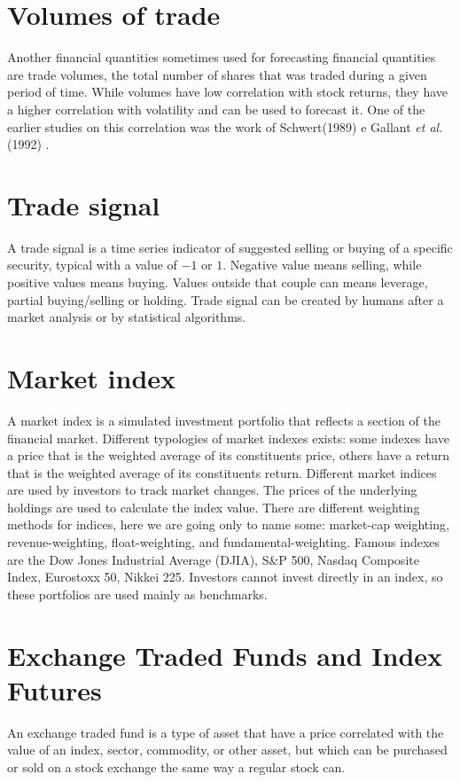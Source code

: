 \section{Volumes of trade}
\label{s:volume_of_trade}

Another financial quantities sometimes used for forecasting financial quantities are trade volumes, the total number of shares that was traded during a given period of time. While volumes have low correlation with stock returns, they have a higher correlation with volatility and can be used to forecast it. One of the earlier studies on this correlation was the work of Schwert(1989) \cite{schwert1989does} e Gallant \textit{et al.} (1992) \cite{gallant1992stock}. 

\section{Trade signal}
\label{s:trade_signal}

A trade signal is a time series indicator of suggested selling or buying of a specific security, typical with a value of $-1$ or $1$. Negative value means selling, while positive values means buying. Values outside that couple can means leverage, partial buying/selling or holding. 
Trade signal can be created by humans after a market analysis or by statistical algorithms.

\section{Market index}
\label{s:market_index}
A market index is a simulated investment portfolio that reflects a section of the financial market. Different typologies of market indexes exists: some indexes have a price that is the weighted average of its constituents price, others have a return that is the weighted average of its constituents return. Different market indices are used by investors to track market changes. 
The prices of the underlying holdings are used to calculate the index value.
There are different weighting methods for indices, here we are going only to name some: market-cap weighting, revenue-weighting, float-weighting, and fundamental-weighting.
Famous indexes are the Dow Jones Industrial Average (DJIA), S\&P 500, Nasdaq Composite Index, Eurostoxx 50, Nikkei 225.
Investors cannot invest directly in an index, so these portfolios are used mainly as benchmarks.

\section{Exchange Traded Funds and Index Futures}
\label{s:etf}
An exchange traded fund is a type of asset that have a price correlated with the value of an index, sector, commodity, or other asset, but which can be purchased or sold on a stock exchange the same way a regular stock can. 

